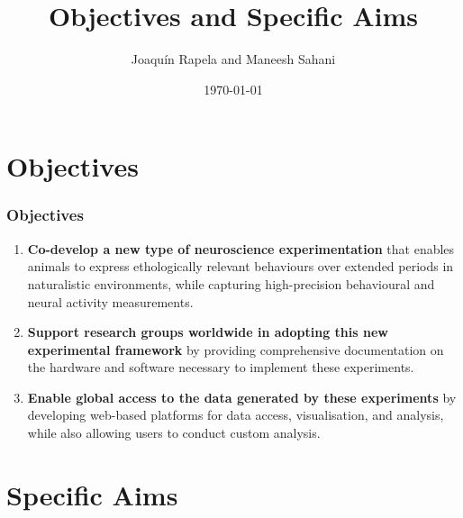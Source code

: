 \documentclass{beamer}
\title{Objectives and Specific Aims}
\author[]{Joaqu\'{i}n Rapela and Maneesh Sahani}
\institute{Gatsby Computational Neuroscience Unit}
\date{\today}
\begin{document}
\frame{\titlepage}

\begin{comment}
\begin{frame}
    \frametitle{Contents}

    \tableofcontents

\end{frame}
\end{comment}


\section{Objectives}

\begin{frame}
    \frametitle{Objectives}

    \begin{enumerate}

        \item \textbf{Co-develop a new type of neuroscience experimentation}
            that enables animals to express ethologically relevant behaviours
            over extended periods in naturalistic environments, while capturing
            high-precision behavioural and neural activity measurements.


        \item \textbf{Support research groups worldwide in adopting this new
            experimental framework} by providing comprehensive documentation on
            the hardware and software necessary to implement these experiments.

        \item \textbf{Enable global access to the data generated by these
            experiments} by developing web-based platforms for data access,
            visualisation, and analysis, while also allowing users to conduct
            custom analysis.

    \end{enumerate}

\end{frame}

\section{Specific Aims}
\end{document}
